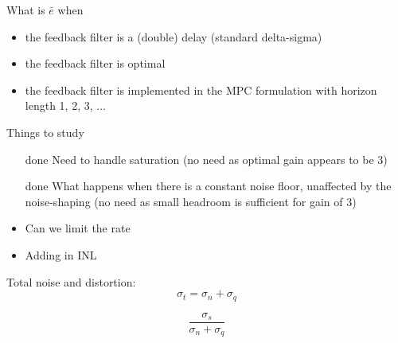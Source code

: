 \documentclass[a4paper]{article}
\begin{document}
What is $\bar{e}$ when
\begin{itemize}
    \item the feedback filter is a (double) delay (standard delta-sigma)
    \item the feedback filter is optimal
    \item the feedback filter is implemented in the MPC formulation with horizon length 1, 2, 3, ...
\end{itemize}
Things to study
\begin{itemize}
    \item[done] Need to handle saturation (no need as optimal gain appears to be 3)
    \item[done] What happens when there is a constant noise floor, unaffected by the noise-shaping (no need as small headroom is sufficient for gain of 3)
    \item Can we limit the rate
    \item Adding in INL
\end{itemize}

Total noise and distortion:
$$
\sigma_t = \sigma_n + \sigma_q
$$

$$
\frac{\sigma_s}{\sigma_n + \sigma_q}
$$
\end{document}

